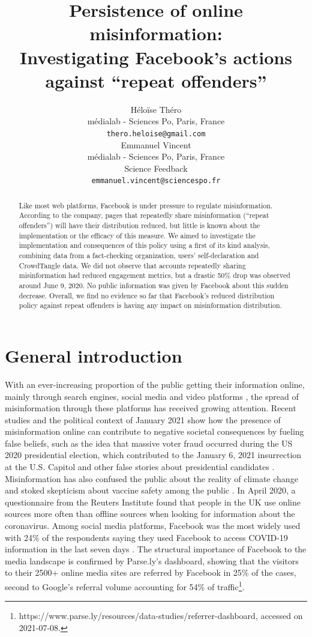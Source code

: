 \documentclass[11pt,a4paper]{article}
\title{Persistence of online misinformation: \\ Investigating Facebook's actions against ``repeat offenders''}
\author{Héloïse Théro \\
  médialab - Sciences Po, Paris, France \\
  \texttt{thero.heloise@gmail.com} \\\And
  Emmanuel Vincent \\
  médialab - Sciences Po, Paris, France \\
  Science Feedback \\
  \texttt{emmanuel.vincent@sciencespo.fr} \\}
\date{}
\begin{document}
\maketitle

\begin{abstract}
Like most web platforms, Facebook is under pressure to regulate misinformation. According to the company, pages that repeatedly share misinformation (“repeat offenders”) will have their distribution reduced, but little is known about the implementation or the efficacy of this measure. We aimed to investigate the implementation and consequences of this policy using a first of its kind analysis, combining data from a fact-checking organization, users’ self-declaration and CrowdTangle data. We did not observe that accounts repeatedly sharing misinformation had reduced engagement metrics, but a drastic 50\% drop was observed around June 9, 2020. No public information was given by Facebook about this sudden decrease. Overall, we find no evidence so far that Facebook’s reduced distribution policy against repeat offenders is having any impact on misinformation distribution.
\end{abstract}

\section{General introduction}

With an ever-increasing proportion of the public getting their information online, mainly through search engines, social media and video platforms \citep{mitchell2016modern}, the spread of misinformation through these platforms has received growing attention. Recent studies and the political context of January 2021 show how the presence of misinformation online can contribute to negative societal consequences by fueling false beliefs, such as the idea that massive voter fraud occurred during the US 2020 presidential election, which contributed to the January 6, 2021 insurrection at the U.S. Capitol \citep{benkler2020mail} and other false stories about presidential candidates \citep{allcott2017social}. Misinformation has also confused the public about the reality of climate change \citep{brulle30years, porter2019can} and stoked skepticism about vaccine safety among the public \citep{featherstone2020feeling, lahouati2020spread}. In April 2020, a questionnaire from the Reuters Institute found that people in the UK use online sources more often than offline sources when looking for information about the coronavirus. Among social media platforms, Facebook was the most widely used with 24\% of the respondents saying they used Facebook to access COVID-19 information in the last seven days \citep{fletcher2020information}. The structural importance of Facebook to the media landscape is confirmed by Parse.ly’s dashboard, showing that the visitors to their 2500+ online media sites are referred by Facebook in 25\% of the cases, second to Google’s referral volume accounting for 54\% of traffic\footnote{https://www.parse.ly/resources/data-studies/referrer-dashboard, accessed on 2021-07-08.}.
\end{document}

